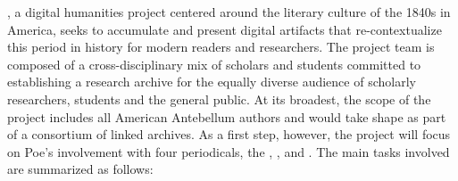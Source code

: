 \projectname, a digital humanities project centered around the literary culture of the 1840s in America, seeks to accumulate and present digital artifacts that re-contextualize this period in history for modern readers and researchers. The project team is composed of a cross-disciplinary mix of scholars and students committed to establishing a research archive for the equally diverse audience of scholarly researchers, students and the general public. At its broadest, the scope of the project includes all American Antebellum authors and would take shape as part of a consortium of linked archives. As a first step, however, the project will focus on Poe's involvement with four periodicals, the \bwj, \slm, \bgm and \gm. The main tasks involved are summarized as follows: